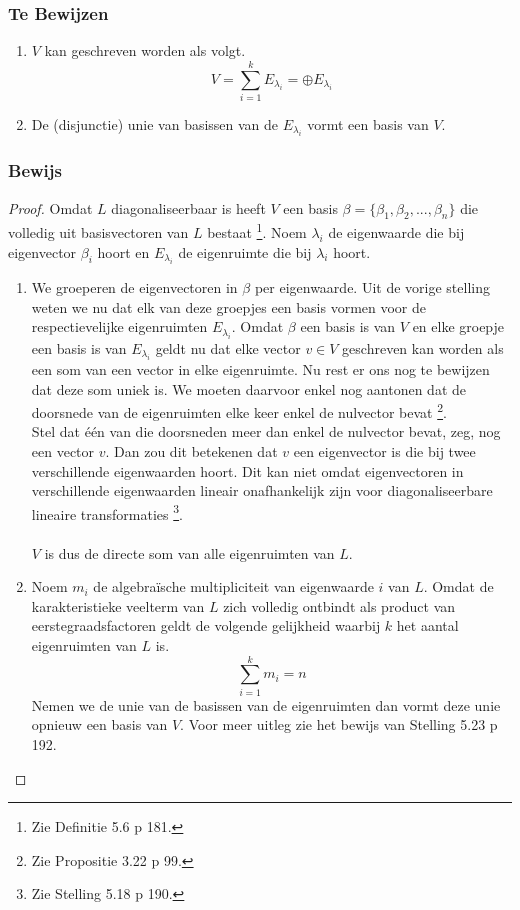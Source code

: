 \documentclass[lineaire_algebra_oplossingen.tex]{subfiles}
\begin{document}
\subsubsection*{Te Bewijzen}
\begin{enumerate}
\item $V$ kan geschreven worden als volgt.
\[
V = \sum_{i=1}^kE_{\lambda_i} = \oplus E_{\lambda_{i}}
\]

\item
De (disjunctie) unie van basissen van de $E_{\lambda_{i}}$ vormt een basis van $V$.

\end{enumerate}

\subsubsection*{Bewijs}
\begin{proof}
Omdat $L$ diagonaliseerbaar is heeft $V$ een basis $\beta=\{\beta_1,\beta_2,...,\beta_n\} $ die volledig uit basisvectoren van $L$ bestaat \footnote{Zie Definitie 5.6 p 181.}.
Noem $\lambda_i$ de eigenwaarde die bij eigenvector $\beta_i$ hoort en $E_{\lambda_i}$ de eigenruimte die bij $\lambda_i$ hoort.

\begin{enumerate}
\item
We groeperen de eigenvectoren in $\beta$ per eigenwaarde.
Uit de vorige stelling weten we nu dat elk van deze groepjes een basis vormen voor de respectievelijke eigenruimten $E_{\lambda_i}$.
Omdat $\beta$ een basis is van $V$ en elke groepje een basis is van $E_{\lambda_i}$ geldt nu dat elke vector $v\in V$ geschreven kan worden als een som van een vector in elke eigenruimte. 
Nu rest er ons nog te bewijzen dat deze som uniek is.
We moeten daarvoor enkel nog aantonen dat de doorsnede van de eigenruimten elke keer enkel de nulvector bevat \footnote{Zie Propositie 3.22 p 99.}.\\

Stel dat \'e\'en van die doorsneden meer dan enkel de nulvector bevat, zeg, nog een vector $v$.
Dan zou dit betekenen dat $v$ een eigenvector is die bij twee verschillende eigenwaarden hoort.
Dit kan niet omdat eigenvectoren in verschillende eigenwaarden lineair onafhankelijk zijn voor diagonaliseerbare lineaire transformaties \footnote{Zie Stelling 5.18 p 190.}.\\\\

$V$ is dus de directe som van alle eigenruimten van $L$.

\item
Noem $m_i$ de algebra\"ische multipliciteit van eigenwaarde $i$ van $L$.
Omdat de karakteristieke veelterm van $L$ zich volledig ontbindt als product van eerstegraadsfactoren geldt de volgende gelijkheid waarbij $k$ het aantal eigenruimten van $L$ is.
\[
\sum_{i=1}^km_i = n
\]
Nemen we de unie van de basissen van de eigenruimten dan vormt deze unie opnieuw een basis van $V$. Voor meer uitleg zie het bewijs van Stelling 5.23 p 192.
\end{enumerate}
\end{proof}
\end{document}

